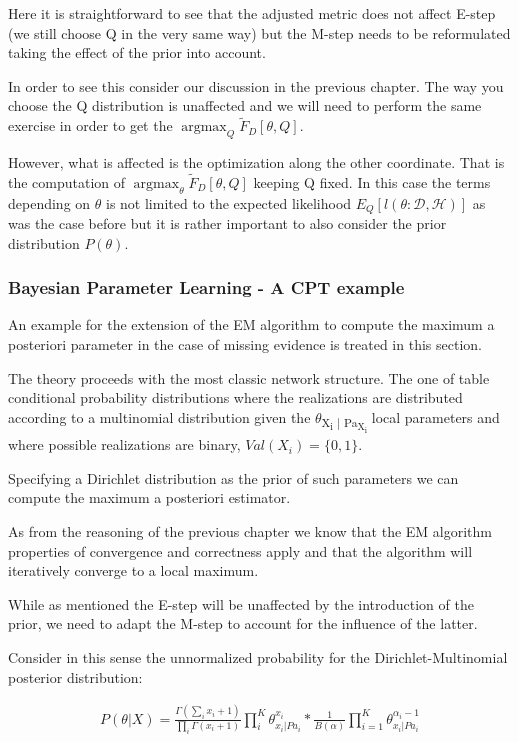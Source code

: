 \documentclass[11pt]{article}
\begin{document}
\begin{article}
Here it is straightforward to see that the adjusted metric does not
affect E-step (we still choose Q in the very same way) but the
M-step needs to be reformulated taking the effect of the prior into
account.

In order to see this consider our discussion in the previous
chapter. The way you choose the Q distribution is unaffected and
we will need to perform the same exercise in order to get the
\(\operatorname*{argmax}_{Q} \tilde{F}_D[\theta, Q]\).

However, what is affected is the optimization along the other
coordinate. That is the computation of
\(\operatorname*{argmax}_{\theta} \tilde{F}_D[\theta, Q]\) keeping Q
fixed. In this case the terms depending on \(\theta\) is not limited to
the expected likelihood \(E_Q[l (\theta: \mathscr{D}, \mathscr{H})]\)
as was the case before but it is rather important to also consider
the prior distribution \(P(\theta)\).

\subsubsection{Bayesian Parameter Learning - A CPT example}
\label{cpt:cpt_bayes_learning}
An example for the extension of the EM algorithm to compute the
maximum a posteriori parameter in the case of missing evidence is
treated in this section.

The theory proceeds with the most classic network structure. The
one of table conditional probability distributions where the
realizations are distributed according to a multinomial
distribution given the \(\theta\)\textsubscript{X\textsubscript{i} | Pa\textsubscript{X\textsubscript{i}}} local parameters and
where possible realizations are binary, \(Val(X_i) = \{0,1 \}\).

Specifying a Dirichlet distribution as the prior of such parameters
we can compute the maximum a posteriori estimator.

As from the reasoning of the previous chapter we know that the EM
algorithm properties of convergence and correctness apply and that
the algorithm will iteratively converge to a local maximum.

While as mentioned the E-step will be unaffected by the
introduction of the prior, we need to adapt the M-step to account
for the influence of the latter.

Consider in this sense the unnormalized probability for the
Dirichlet-Multinomial posterior distribution:

\begin{align} \label{eq:dirichlet-multinomial-score}
P(\theta | X) = \frac{\Gamma(\sum_i x_i + 1)}{\prod_i \Gamma(x_i + 1)} \prod_i^K \theta_{x_i | Pa_i}^{x_i}  * \frac{1}{B(\alpha)} \prod_{i=1}^K \theta_{x_i | Pa_i}^{\alpha_i - 1}
\end{align}


\end{article}
\end{document}
